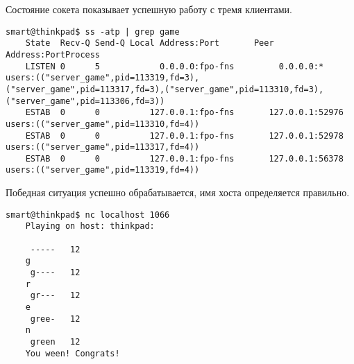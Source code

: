 Состояние сокета показывает успешную работу с тремя клиентами.
\begin{Verbatim}[frame=single]
    smart@thinkpad$ ss -atp | grep game
    State  Recv-Q Send-Q Local Address:Port       Peer Address:PortProcess
    LISTEN 0      5            0.0.0.0:fpo-fns         0.0.0.0:*           users:(("server_game",pid=113319,fd=3),("server_game",pid=113317,fd=3),("server_game",pid=113310,fd=3),("server_game",pid=113306,fd=3))
    ESTAB  0      0          127.0.0.1:fpo-fns       127.0.0.1:52976       users:(("server_game",pid=113310,fd=4))                                                                                                
    ESTAB  0      0          127.0.0.1:fpo-fns       127.0.0.1:52978       users:(("server_game",pid=113317,fd=4))                                                                                                
    ESTAB  0      0          127.0.0.1:fpo-fns       127.0.0.1:56378       users:(("server_game",pid=113319,fd=4))
\end{Verbatim}

Победная ситуация успешно обрабатывается, имя хоста определяется правильно.
\begin{Verbatim}[frame=single]
    smart@thinkpad$ nc localhost 1066
    Playing on host: thinkpad:
    
     -----   12
    g
     g----   12
    r
     gr---   12
    e
     gree-   12
    n
     green   12
    You ween! Congrats!
\end{Verbatim}